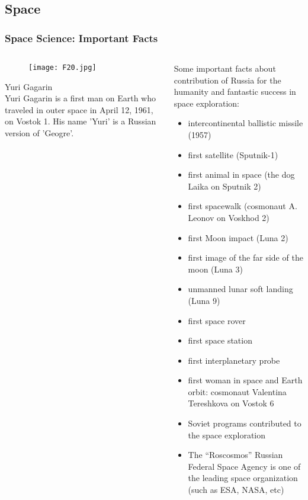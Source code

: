 \documentclass[pdflatex,compress,8pt,
	xcolor={dvipsnames,dvipsnames,svgnames,x11names,table},
	hyperref={colorlinks = true,breaklinks = true, urlcolor = NavyBlue, breaklinks = true}]{beamer}
\begin{document}
\subsection{Space}
\begin{frame}\frametitle{Space Science: Important Facts}
\begin{minipage}[0.4\textheight]{\textwidth}
\begin{columns}[T]
\begin{column}{0.3\textwidth}
\begin{figure}[H]
	\centering
		\texttt{[image: F20.jpg]}
\end{figure}
\small{Yuri Gagarin\\
Yuri Gagarin is a first man on Earth who traveled in outer space in April 12, 1961, on Vostok 1. His name 'Yuri' is a Russian version of 'Geogre'.}
\end{column}
\begin{column}{0.7\textwidth}
Some important facts about contribution of Russia for the humanity and fantastic success in space exploration:
\begin{itemize}
	\item intercontinental ballistic missile (1957)
	\item first satellite (Sputnik-1)
	\item first animal in space (the dog Laika on Sputnik 2)
	\item first spacewalk (cosmonaut A. Leonov on Voskhod 2)
	\item first Moon impact (Luna 2)
	\item first image of the far side of the moon (Luna 3) 
	\item unmanned lunar soft landing (Luna 9)
	\item first space rover
	\item first space station 
	\item first interplanetary probe
	\item first woman in space and Earth orbit: cosmonaut Valentina Tereshkova on Vostok 6
	\item Soviet programs contributed to the space exploration
	\item The “Roscosmos” Russian Federal Space Agency is one of the leading space organization (such as ESA, NASA, etc)
 \end{itemize}
\end{column}
\end{columns}
\end{minipage}
\end{frame}
\end{document}

